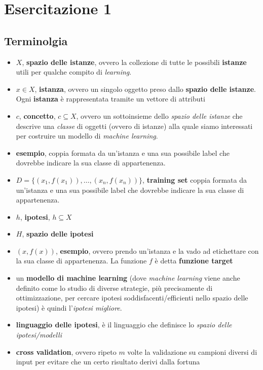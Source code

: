 
\section{Esercitazione 1} 
\subsection{Terminolgia} 
\begin{itemize} 
    \item $X$, \textbf{spazio delle istanze}, ovvero la collezione di tutte le possibili \textbf{istanze} utili per qualche compito di \textit{learning}.
    \item $x\in X$, \textbf{istanza}, ovvero un singolo oggetto preso dallo \textbf{spazio delle istanze}. Ogni \textbf{istanza} è rappresentata tramite un vettore di attributi  
    \item $c$, \textbf{concetto}, $c\subseteq X$, ovvero un sottoinsieme dello \textit{spazio delle istanze} che descrive una \textit{classe} di oggetti (ovvero di istanze) alla quale siamo interessati per costruire un modello di \textit{machine learning}. 
    \item \textbf{esempio}, coppia formata da un’istanza e una sua possibile label che dovrebbe indicare la sua classe di appartenenza.
    \item $D=\{(x_1,f(x_1)),\ldots,(x_n,f(x_n))\}$, \textbf{training set} coppia formata da un’istanza e una sua possibile label che dovrebbe indicare la sua classe di appartenenza.
    \item $h$, \textbf{ipotesi}, $h\subseteq X$ 
    \item $H$, \textbf{spazio delle ipotesi} 
    \item $(x, f(x))$, \textbf{esempio}, ovvero prendo un'istanza e la vado ad etichettare con la sua classe di appartenenza. La funzione $f$ è detta \textbf{funzione target} 
    \item un \textbf{modello di machine learning} (dove \textit{machine learning} viene anche definito come lo studio di diverse strategie, più precisamente di ottimizzazione, per cercare ipotesi soddisfacenti/efficienti nello spazio delle ipotesi) è quindi l'\textit{ipotesi migliore}. 
    \item \textbf{linguaggio delle ipotesi}, è il linguaggio che definisce lo \textit{spazio delle ipotesi/modelli} 
    \item \textbf{cross validation}, ovvero ripeto $m$ volte la validazione su campioni diversi di input per evitare che un certo risultato derivi dalla fortuna 

\end{itemize}
